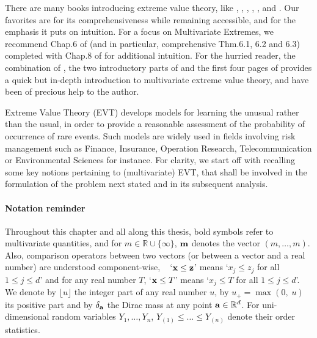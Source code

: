 There are many books introducing extreme value theory, like \cite{Leadbetter1983}, \cite{Resnick1987},  \cite{Coles2001}, \cite{BGTS04}, \cite{dHF06}, and \cite{Resnick2007}. Our favorites are \cite{Resnick2007} for its comprehensiveness while remaining accessible, and \cite{Coles2001} for the emphasis it puts on intuition. For a focus on Multivariate Extremes, we recommend Chap.6 of \cite{Resnick2007} (and in particular, comprehensive Thm.6.1, 6.2 and 6.3) completed with Chap.8 of \cite{Coles2001} for additional intuition.
%
For the hurried reader, the combination of
\cite{Segers12}, the two introductory parts of \cite{Einmahl2012} and the first four pages of  \cite{coles1991modeling} provides a quick but in-depth introduction to multivariate extreme value theory, and have been of precious help to the author.

Extreme Value Theory (\textsc{EVT}) develops models for learning the
unusual rather than the usual, in order to provide a reasonable
assessment of the probability of occurrence of rare events. Such models are widely used in fields
involving risk management such as Finance, Insurance, Operation Research, Telecommunication
or Environmental Sciences for instance. For clarity, we start off with recalling some key notions pertaining to (multivariate) \textsc{EVT}, that shall be involved in the formulation of the problem next stated and in its subsequent analysis. 

\paragraph{Notation reminder}
Throughout this chapter and all along this thesis, bold symbols refer to multivariate quantities, and for $m \in \mathbb{R}\cup \{\infty\}$, $\mathbf m$ denotes the vector $(m,\ldots,m)$.
Also, comparison operators  between two vectors (or between a vector and a real number) are
understood component-wise, \ie~ `$\mathbf x \le \mathbf z$' means `$x_j \le z_j$
for all $1\le j\le d$' and  for any real number $T$,  `$\mathbf x\le T$' means `$x_j \le T$ for all $1\le j\le d$'. 
We denote by $\lfloor u \rfloor$ the integer part of any real number $u$, by $u_+=\max(0,\; u)$ its positive part and by $\delta_{\mathbf a}$ the Dirac mass at any point $\mathbf a\in \mathbb{R}^d$.  
For uni-dimensional random variables $Y_1,\ldots,Y_n$, $Y_{(1)} \le \ldots\le Y_{(n)}$ denote their order statistics.


